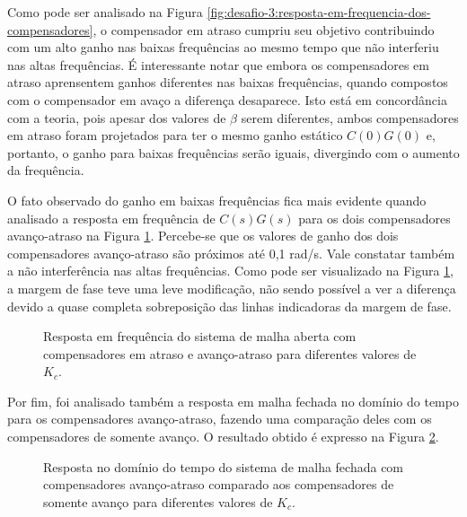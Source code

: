 Como pode ser analisado na Figura
\ref{fig:desafio-3:resposta-em-frequencia-dos-compensadores}, o compensador em
atraso cumpriu seu objetivo contribuindo com um alto ganho nas baixas frequências
ao mesmo tempo que não interferiu nas altas frequências. É interessante notar
que embora os compensadores em atraso aprensentem ganhos diferentes nas baixas
frequências, quando compostos com o compensador em avaço a diferença desaparece.
Isto está em concordância com a teoria, pois apesar dos valores de $\beta$
serem diferentes, ambos compensadores em atraso foram projetados para ter o
mesmo ganho estático $C(0)G(0)$ e, portanto, o ganho para baixas frequências
serão iguais, divergindo com o aumento da frequência.

O fato observado do ganho em baixas frequências fica mais evidente quando
analisado a resposta em frequência de $C(s)G(s)$ para os dois compensadores
avanço-atraso na Figura
\ref{fig:desafio-3:resposta-em-frequencia-da-malha-aberta}. Percebe-se que os
valores de ganho dos dois compensadores avanço-atraso são próximos até 0,1
rad/s. Vale constatar também a não interferência nas altas frequências. Como
pode ser visualizado na Figura
\ref{fig:desafio-3:resposta-em-frequencia-da-malha-aberta}, a margem de fase
teve uma leve modificação, não sendo possível a ver a diferença devido a quase
completa sobreposição das linhas indicadoras da margem de fase.

\begin{figure}[H]
    \caption{Resposta em frequência do sistema de malha aberta com compensadores
    em atraso e avanço-atraso para diferentes valores de $K_c$.}
    \vspace{-10pt}
    \hspace{-30pt}
    \label{fig:desafio-3:resposta-em-frequencia-da-malha-aberta}
    \begin{minipage}{\linewidth}
        
    \end{minipage}
\end{figure}

Por fim, foi analisado também a resposta em malha fechada no domínio do tempo
para os compensadores avanço-atraso, fazendo uma comparação deles com os
compensadores de somente avanço. O resultado obtido é expresso na Figura
\ref{fig:desafio-3:resposta-dominio-do-tempo-dos-compensadores-avanco-atraso}.

\begin{figure}[H]
    \caption{Resposta no domínio do tempo do sistema de malha fechada com
    compensadores avanço-atraso comparado aos compensadores de somente avanço
    para diferentes valores de $K_c$.}
    \vspace{-10pt}
    \hspace{-30pt}
    \label{fig:desafio-3:resposta-dominio-do-tempo-dos-compensadores-avanco-atraso}
    \begin{minipage}{\linewidth}
        
    \end{minipage}
\end{figure}

